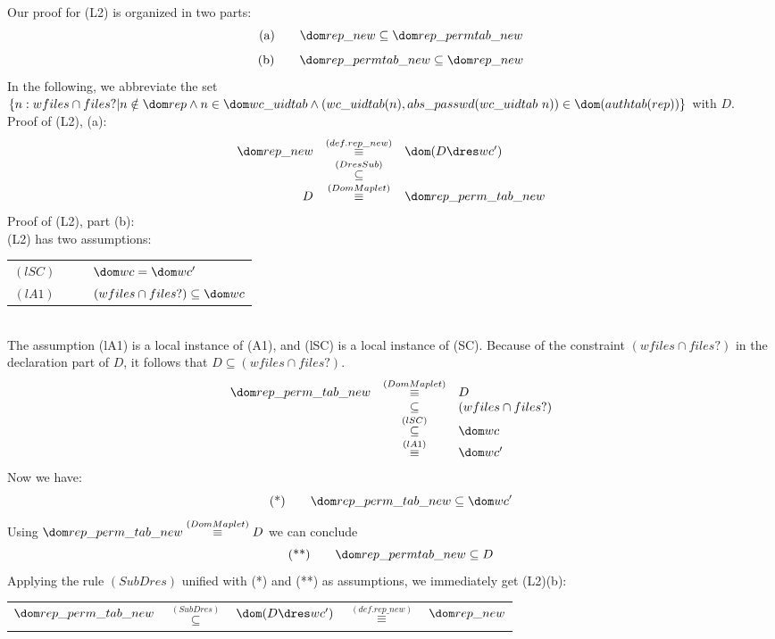 Our proof for (L2) is organized in two parts:
%
\[\mbox{(a)} \quad\quad\dom rep\_new \subseteq \dom
rep\_permtab\_new\]
%
\[\mbox{(b)} \quad\quad\dom rep\_permtab\_new \subseteq \dom
rep\_new\]
%
In the following, we abbreviate the set $\{ n: wfiles \cap files? | n \notin \dom rep \land n \in \dom wc\_uidtab \land (wc\_uidtab(n), abs\_passwd(wc\_uidtab~n)) \in \dom(authtab(rep))\}$ with $D$.\\
Proof of (L2), (a):
%
%
\[
\begin{array}{rcl}
\dom rep\_new & \stackrel{(def.rep\_new)}{\equiv}& \dom (D \dres wc')\\ 
& \stackrel{(DresSub)}{\subseteq} & \\
D & \stackrel{(DomMaplet)}{\equiv}& \dom rep\_perm\_tab\_new\\
\end{array}
\]
%
%
Proof of (L2), part (b):\\
(L2) has two assumptions:\\[0.4cm]
\begin{tabular}{cl}
$(lSC)\quad\quad $ & $ \dom wc = \dom wc'$\\
$(lA1)\quad\quad $ & $ (wfiles \cap files?) \subseteq \dom wc$\\
\end{tabular}\\[0.4cm]
The assumption (lA1) is a local instance of (A1), and (lSC) is a local instance of (SC). Because of the constraint $(wfiles \cap files?)$ in the declaration part of $D$, it follows that $D \subseteq (wfiles \cap files?)$. \\
\[
\begin{array}{rcl}
\dom rep\_perm\_tab\_new &\stackrel{(DomMaplet)}{\equiv}& D \\ %
& \subseteq  & (wfiles \cap files?) \\%
&\stackrel{(lSC)}{\subseteq}& \dom wc \\ %
&\stackrel{(lA1)}{\equiv}& \dom wc'\\%
\end{array}
\]
Now we have:\\ 
\[\mbox{(*)}\quad\quad\dom rep\_perm\_tab\_new \subseteq \dom wc'\]
Using $\dom rep\_perm\_tab\_new \stackrel{(DomMaplet)}{\equiv} D$ we can conclude
\[\mbox{(**)}\quad\quad \dom rep\_permtab\_new \subseteq D\]
Applying the rule $(SubDres)$ unified with (*) and (**) as assumptions, we immediately get (L2)(b):\\[0.4cm]
\begin{tabular}{lclcr}
$\dom rep\_perm\_tab\_new$ & $\stackrel{(SubDres)}{\subseteq}$ & $ \dom(D \dres wc')$%
& $\stackrel{(def.rep\_new)}{\equiv}$ & $ \dom rep\_new$\\
\end{tabular}
%
%
%
